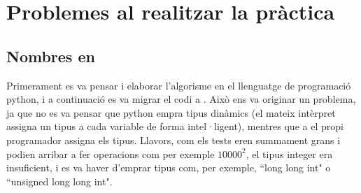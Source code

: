 \documentclass[12pt, letterpaper]{article}
\begin{document}
\section{Problemes al realitzar la pràctica}
\subsection{Nombres en \cpluspluslogo}
Primerament es va pensar i elaborar l'algorisme en el llenguatge de programació python, i a continuació es va migrar el codi a \cpluspluslogo. Això ens va originar un problema, ja que no es va pensar que python empra tipus dinàmics (el mateix intèrpret assigna un tipus a cada variable de forma intel·ligent), mentres que a {\cpluspluslogo} el propi programador assigna els tipus. Llavors, com els tests eren summament grans i podien arribar a fer operacions com per exemple $10000^{2}$, el tipus integer era insuficient, i es va haver d'emprar tipus com, per exemple, ``long long int" o ``unsigned long long int".
\end{document}
